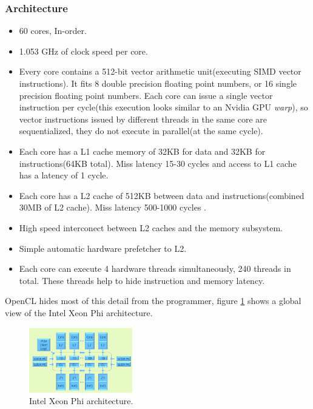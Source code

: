 \subsubsection{Architecture}
\begin{itemize}
    \item 60 cores, In-order\cite{phi_specs}.
    \item 1.053 GHz of clock speed per core\cite{phi_specs}.
    \item Every core contains a 512-bit vector arithmetic unit(executing SIMD vector instructions). It fits 8 double precision 
        floating point numbers, or 16 single precision floating point numbers. Each core can issue a single vector instruction per
        cycle\cite{opencl_phi}(this execution looks similar to an Nvidia GPU \emph{warp}), so vector instructions issued by 
        different threads in the same core are sequentialized, they do not execute in parallel(at the same cycle).
    \item Each core has a L1 cache memory of 32KB for data and 32KB for instructions(64KB total). Miss latency 15-30
        cycles and access to L1 cache has a latency of 1 cycle\cite{opencl_phi}.
    \item Each core has a L2 cache of 512KB between data and instructions(combined 30MB of L2 cache). Miss latency 500-1000 cycles
        \cite{opencl_phi,phi_specs}.
    \item High speed interconect between L2 caches and the memory subsystem\cite{opencl_phi}.
    \item Simple automatic hardware prefetcher to L2\cite{opencl_phi}.
    \item Each core can execute 4 hardware threads simultaneously, 240 threads in total. These threads help to hide 
        instruction and memory latency\cite{opencl_phi}.
\end{itemize}

\par{OpenCL hides most of this detail from the programmer, figure \ref{PhiArch} shows a global view of the Intel Xeon Phi 
    architecture.\cite{opencl_phi}}

\begin{figure}[!h]
    \centering
    \includegraphics[width=0.4\textwidth]{figures/phi_arch.png}
    \caption{Intel Xeon Phi architecture\cite{opencl_phi}.}
    \label{PhiArch}
\end{figure}

